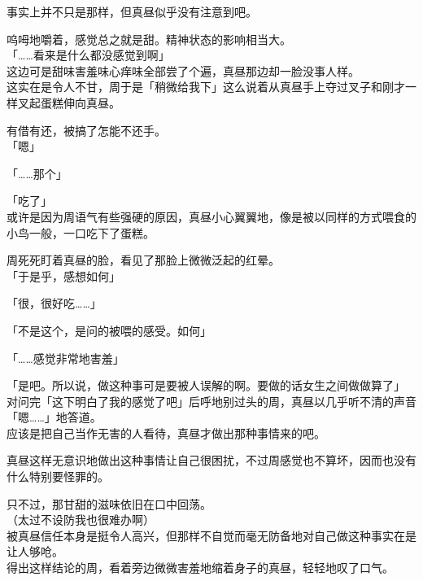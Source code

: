 事实上并不只是那样，但真昼似乎没有注意到吧。

呜呣地嚼着，感觉总之就是甜。精神状态的影响相当大。\\

「……看来是什么都没感觉到啊」\\

这边可是甜味害羞味心痒味全部尝了个遍，真昼那边却一脸没事人样。\\

这实在是令人不甘，周于是「稍微给我下」这么说着从真昼手上夺过叉子和刚才一样叉起蛋糕伸向真昼。

有借有还，被搞了怎能不还手。\\

「嗯」

「……那个」

「吃了」\\

或许是因为周语气有些强硬的原因，真昼小心翼翼地，像是被以同样的方式喂食的小鸟一般，一口吃下了蛋糕。

周死死盯着真昼的脸，看见了那脸上微微泛起的红晕。\\

「于是乎，感想如何」

「很，很好吃……」

「不是这个，是问的被喂的感受。如何」

「……感觉非常地害羞」

「是吧。所以说，做这种事可是要被人误解的啊。要做的话女生之间做做算了」\\

对问完「这下明白了我的感觉了吧」后呼地别过头的周，真昼以几乎听不清的声音「嗯……」地答道。\\

应该是把自己当作无害的人看待，真昼才做出那种事情来的吧。

真昼这样无意识地做出这种事情让自己很困扰，不过周感觉也不算坏，因而也没有什么特别要怪罪的。

只不过，那甘甜的滋味依旧在口中回荡。\\

（太过不设防我也很难办啊）\\

被真昼信任本身是挺令人高兴，但那样不自觉而毫无防备地对自己做这种事实在是让人够呛。\\

得出这样结论的周，看着旁边微微害羞地缩着身子的真昼，轻轻地叹了口气。
